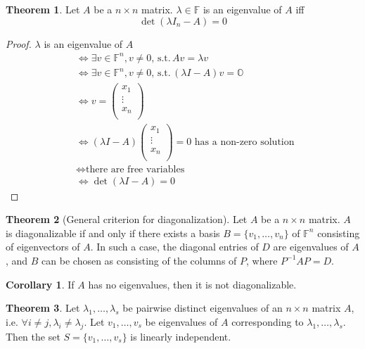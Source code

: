 \documentclass[fleqn, a4paper, 12pt, draft]{article}
\theoremstyle{definition}
\theoremstyle{theorem}
\newtheorem{theorem}{Theorem} %
\newtheorem{corollary}{Corollary}
\theoremstyle{remark}
\newcommand{\suchthat}{\mathrm{\,s.t.\,}}
\numberwithin{corollary}{theorem}
\numberwithin{equation}{theorem}
\begin{document}
\begin{theorem}
	Let $A$ be a $n \times n$ matrix. $\lambda \in \mathbb{F}$ is an eigenvalue of $A$ iff
	\begin{equation*}
		\det (\lambda I_n - A) = 0
	\end{equation*}
\end{theorem}

\begin{proof}
	$\lambda$ is an eigenvalue of $A$
	\begin{align*}
		&\iff \exists v \in \mathbb{F}^n, v \neq 0, \suchthat Av = \lambda v\\
		&\iff \exists v \in \mathbb{F}^n, v \neq 0, \suchthat (\lambda I - A) v = \mathbb{O}\\
		&\iff v = 
		\begin{pmatrix}
			x_1\\
			\vdots\\
			x_n\\
		\end{pmatrix}\\
		&\iff (\lambda I - A) 
		\begin{pmatrix}
			x_1\\
			\vdots\\
			x_n\\
		\end{pmatrix}
		= 0 \text{ has a non-zero solution }\\
		&\iff \text{there are free variables }\\
		&\iff \det (\lambda I - A) = 0
	\end{align*}
\end{proof}

\begin{theorem}[General criterion for diagonalization]\label{general criterion for diagonalization}
	Let $A$ be a $n \times n$ matrix. $A$ is diagonalizable if and only if there exists a basis $B = \{v_1, \dots, v_n\}$ of $\mathbb{F}^n$ consisting of eigenvectors of $A$. In such a case, the diagonal entries of $D$ are eigenvalues of $A$, and $B$ can be chosen as consisting of the columns of $P$, where $P^{-1} A P = D$. 
\end{theorem}

\begin{corollary}
	If $A$ has no eigenvalues, then it is not diagonalizable.
\end{corollary}

\begin{theorem}
	Let $\lambda_1, \dots, \lambda_s$ be pairwise distinct eigenvalues of an $n \times n$ matrix $A$, i.e. $\forall i \neq j, \lambda_i \neq \lambda_j$. Let $v_1, \dots, v_s$ be eigenvalues of $A$ corresponding to $\lambda_1, \dots, \lambda_s$. Then the set $S = \{v_1, \dots, v_s\}$ is linearly independent.
\end{theorem}
\end{document}
